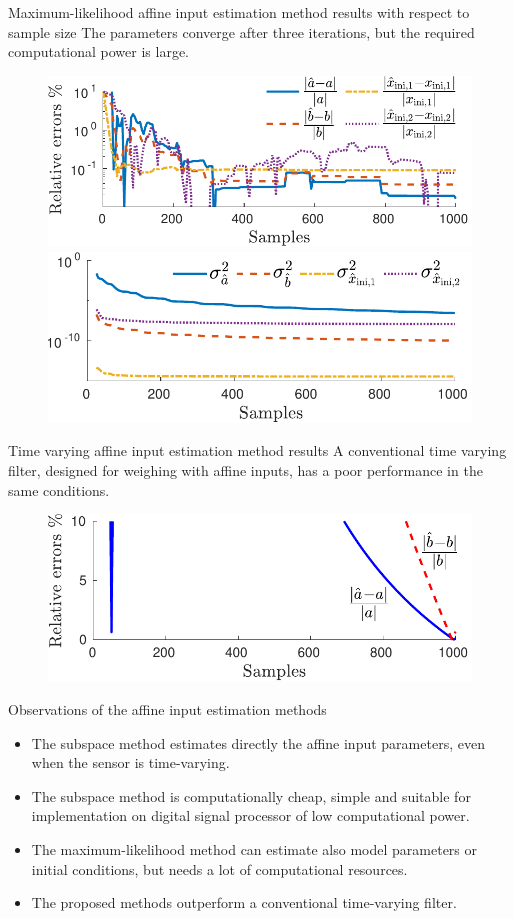 \documentclass[presentation]{beamer}
\begin{document}
\begin{frame}[label={slide:affine-input-estimation5}]{Maximum-likelihood affine input estimation method results with respect to sample size}
The parameters converge after three iterations, but the required computational power is large.
\begin{figure}[htb!]
\centering
\includegraphics[width=0.55\columnwidth]{./fig/Aff_Fig_8.pdf} 
\includegraphics[width=0.55\columnwidth]{./fig/Aff_Fig_9.pdf} 
\end{figure}
\end{frame}

\begin{frame}[label={slide:affine-input-estimation6}]{Time varying affine input estimation method results}
A conventional time varying filter, designed for weighing with affine inputs, has a poor performance in the same conditions. 
\begin{figure}[htb!]
\centering
\includegraphics[width=0.55\columnwidth]{./fig/Aff_Fig_10.pdf} 
\end{figure}
\end{frame}

\begin{frame}[label={slide:affine-input-estimation7}]{Observations of the affine input estimation methods}
\begin{itemize}
\item The subspace method estimates directly the affine input parameters, even when the sensor is time-varying.
\item The subspace method is computationally cheap, simple and suitable for implementation on digital signal processor of low computational power. 
\item The maximum-likelihood method can estimate also model parameters or initial conditions, but needs a lot of computational resources.
\item The proposed methods outperform a conventional time-varying filter.
\end{itemize}
\end{frame}
\end{document}
